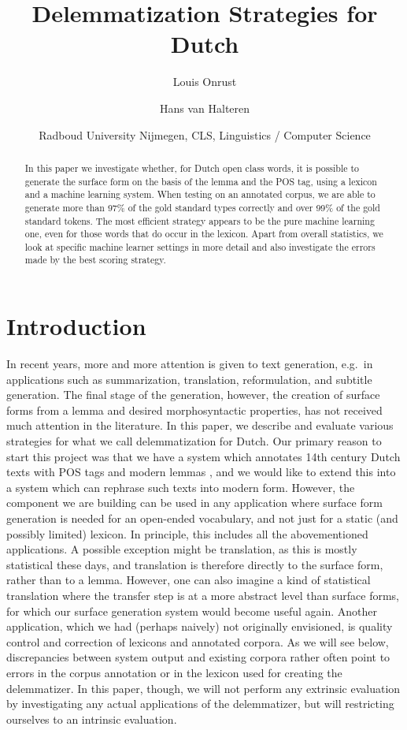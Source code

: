 \documentclass[a4paper,10pt,twoside]{article}
\title{Delemmatization Strategies for Dutch}
\author{Louis Onrust \and Hans van Halteren}
\date{Radboud University Nijmegen, CLS,  Linguistics / Computer Science}
\begin{document}
\maketitle\thispagestyle{empty} %

\begin{abstract}
In this paper we investigate whether, for Dutch open class words, it is possible to generate the surface form on the basis of the lemma and the POS tag, using a lexicon and a machine learning system. When testing on an annotated corpus, we are able to generate more than 97\% of the gold standard types correctly and over 99\% of the gold standard tokens. The most efficient strategy appears to be the pure machine learning one, even for those words that do occur in the lexicon. Apart from overall statistics, we look at specific machine learner settings in more detail and also investigate the errors made by the best scoring strategy. 

\end{abstract}



\section{Introduction}
\label{sec_intro}

In recent years, more and more attention is given to text generation, e.g.\ in applications such as summarization, translation, reformulation, and subtitle generation. The final stage of the generation, however, the creation of surface forms from a lemma and desired morphosyntactic properties, has not received much attention in the literature. In this paper, we describe and evaluate various strategies for what we call delemmatization for Dutch. Our primary reason to start this project was that we have a system which annotates 14th century Dutch texts with POS tags and modern lemmas \cite{REFadelheid}, and we would like to extend this into a system which can rephrase such texts into modern form. However, the component we are building can be used in any application where surface form generation is needed for an open-ended vocabulary, and not just for a static (and possibly limited) lexicon. In principle, this includes all the abovementioned applications. A possible exception might be translation, as this is mostly statistical these days, and translation is therefore directly to the surface form, rather than to a lemma. However, one can also imagine a kind of statistical translation where the transfer step is at a more abstract level than surface forms, for which our surface generation system would become useful again. Another application, which we had (perhaps naively) not originally envisioned, is quality control and correction of lexicons and annotated corpora. As we will see below, discrepancies between system output and existing corpora rather often point to errors in the corpus annotation or in the lexicon used for creating the delemmatizer. In this paper, though, we will not perform any extrinsic evaluation by investigating any actual applications of the delemmatizer, but will restricting ourselves to an intrinsic evaluation.
\end{document}
